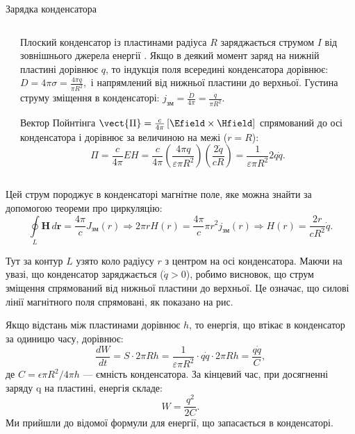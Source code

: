 \documentclass{beamer}
\begin{document}
\begin{frame}{Зарядка конденсатора}{}
\begin{columns}
\begin{column}{0.35\linewidth}
		\end{column}
		\begin{column}{0.65\linewidth}
			\begin{overprint}
				\begin{block}{}\justifying
					Плоский конденсатор із пластинами радіуса \( R \) заряджається струмом \( I \) від зовнішнього джерела енергії . Якщо в
					деякий момент
					заряд на нижній пластині дорівнює \( q \), то індукція поля всередині конденсатора дорівнює:
					\(
					D = 4 \pi \sigma = \frac{4 \pi q}{\pi R^2},
					\)
					і напрямлений від нижньої пластини до верхньої.
					Густина струму зміщення в конденсаторі:
					\(
					j_{\text{зм}} = \frac{\dot{D}}{4 \pi} = \frac{\dot{q}}{\pi R^2}.
					\)
				\end{block}
				\begin{block}{}\justifying
					Вектор Пойнтінга
					\(
					\vect{\Pi} = \frac{c}{4\pi}\left[\Efield\times\Hfield\right]
					\)
					спрямований до осі конденсатора і дорівнює за величиною на межі (\( r = R \)):
					\[
						\Pi = \frac{c}{4 \pi} EH = \frac{c}{4 \pi} \left( \frac{4 \pi q}{\varepsilon \pi R^2} \right) \left( \frac{2
							\dot{q}}{c R}
						\right) =
						\frac{1}{\varepsilon
							\pi R^2} 2 q \dot{q}.
					\]
				\end{block}
			\end{overprint}
		\end{column}
	\end{columns}
	\begin{overprint}
		\onslide<1-2>
		\begin{block}{}\justifying
			Цей струм породжує в конденсаторі магнітне поле, яке можна знайти за допомогою теореми про циркуляцію:
			\[
				\oint\limits_{L} \mathbf{H} \, d\mathbf{r} = \frac{4 \pi}{c} J_{\text{зм}}(r)
				\Rightarrow 2 \pi r H(r) = \frac{4 \pi}{c} \pi r^2 j_{\text{зм}}(r)
				\Rightarrow H(r) = \frac{2r}{c R^2} \dot{q}.
			\]

			Тут за контур \( L \) узято коло радіусу \( r \) з центром на осі конденсатора. Маючи на увазі, що конденсатор заряджається (\(
			\dot{q} > 0 \)), робимо висновок, що струм зміщення спрямований від нижньої пластини до верхньої. Це означає, що силові лінії
			магнітного поля
			спрямовані, як 	показано на рис.
		\end{block}
		\onslide<3>
		\begin{block}{}\justifying
			Якщо відстань між пластинами дорівнює \( h \), то енергія, що втікає в конденсатор за одиницю часу, дорівнює:
			\[
				\frac{dW}{dt} = S \cdot 2 \pi R h = \frac{1}{\varepsilon \pi R^2} \cdot q \dot{q} \cdot 2 \pi R h = \frac{q \dot{q}}{C},
			\]
			де \( C = \epsilon \pi R^2 / 4\pi h\) --- ємність конденсатора. За кінцевий час, при досягненні заряду q на пластині, енергія складе:
			\[
				W = \frac{q^2}{2C}.
			\]
			Ми прийшли до відомої формули для енергії, що запасається в конденсаторі.
		\end{block}
	\end{overprint}
\end{frame}
\end{document}
